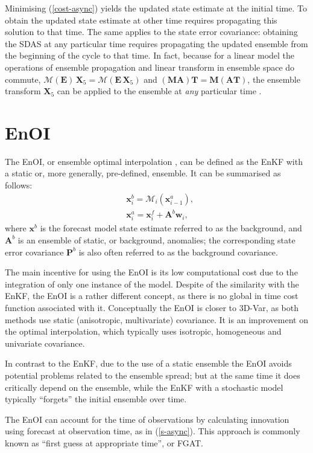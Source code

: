 \documentclass[11pt]{report}
\newcommand{\mb} {\mathbf}
\begin{document}
Minimising (\ref{cost-async}) yields the updated state estimate at the initial time.
To obtain the updated state estimate at other time requires propagating this solution to that time.
The same applies to the state error covariance: obtaining the SDAS at any particular time requires propagating the updated ensemble from the beginning of the cycle to that time.
In fact, because for a linear model the operations of ensemble propagation and linear transform in ensemble space do commute, $\mathcal M (\mb E) \, \mb X_5 = \mathcal M (\mb E \, \mb X_5)$ and $(\mb M \mb A) \mb T = \mb M (\mb A \mb T)$, the ensemble transform $\mb X_5$ can be applied to the ensemble at \emph{any} particular time \citep{eve00a}.

\section{EnOI}

The EnOI, or ensemble optimal interpolation \citep{eve03a}, can be defined as the EnKF with a static or, more generally, pre-defined, ensemble.
It can be summarised as follows:
\begin{align}
  \label{enoi-for}
  & \mb x^b_i = \mathcal M_i(\mb x^a_{i-1}),\\
  & \mb x^a_i = \mb x^f_i + \mb A^b \mb w_i,
\end{align}
where $\mb x^b$ is the forecast model state estimate referred to as the background, and $\mb A^b$ is an ensemble of static, or background, anomalies; the corresponding state error covariance $\mb P^b$ is also often referred to as the background covariance.

The main incentive for using the EnOI is its low computational cost due to the integration of only one instance of the model.
Despite of the similarity with the EnKF, the EnOI is a rather different concept, as there is no global in time cost function associated with it.
Conceptually the EnOI is closer to 3D-Var, as both methods use static (anisotropic, multivariate) covariance.
It is an improvement on the optimal interpolation, which typically uses isotropic, homogeneous and univariate covariance.

In contrast to the EnKF, due to the use of a static ensemble the EnOI avoids potential problems related to the ensemble spread; but at the same time it does critically depend on the ensemble, while the EnKF with a stochastic model typically ``forgets'' the initial ensemble over time.

The EnOI can account for the time of observations by calculating innovation using forecast at observation time, as in (\ref{s-async}).
This approach is commonly known as ``first guess at appropriate time'', or FGAT.
\end{document}
